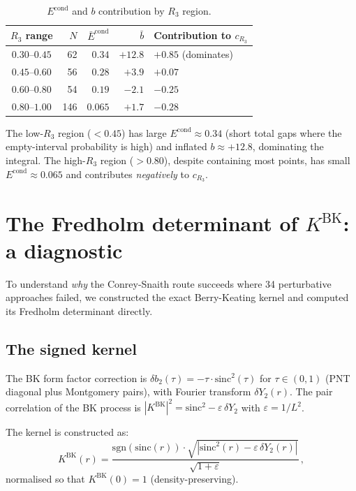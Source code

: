 \documentclass[11pt]{article}
\begin{document}
\begin{table}[ht]
\centering
\caption{$E^{\mathrm{cond}}$ and $b$ contribution by $R_3$ region.}
\label{tab:regions}
\begin{tabular}{crrrl}
\toprule
$R_3$ range & $N$ & $\bar{E}^{\mathrm{cond}}$ & $\bar{b}$ & Contribution to $c_{R_3}$ \\
\midrule
$0.30$--$0.45$ & 62 & $0.34$ & $+12.8$ & $+0.85$ (dominates) \\
$0.45$--$0.60$ & 56 & $0.28$ & $+3.9$ & $+0.07$ \\
$0.60$--$0.80$ & 54 & $0.19$ & $-2.1$ & $-0.25$ \\
$0.80$--$1.00$ & 146 & $0.065$ & $+1.7$ & $-0.28$ \\
\bottomrule
\end{tabular}
\end{table}

The low-$R_3$ region ($< 0.45$) has large $E^{\mathrm{cond}} \approx 0.34$
(short total gaps where the empty-interval probability is high) and inflated
$b \approx +12.8$, dominating the integral. The high-$R_3$ region ($> 0.80$),
despite containing most points, has small $E^{\mathrm{cond}} \approx 0.065$
and contributes \emph{negatively} to $c_{R_3}$.


\section{The Fredholm determinant of $K^{\mathrm{BK}}$: a diagnostic}
\label{sec:fredholm}

To understand \emph{why} the Conrey-Snaith route succeeds where 34 perturbative
approaches failed, we constructed the exact Berry-Keating kernel and computed
its Fredholm determinant directly.

\subsection{The signed kernel}

The BK form factor correction is $\delta b_2(\tau) = -\tau \cdot \mathrm{sinc}^2(\tau)$
for $\tau \in (0,1)$ (PNT diagonal plus Montgomery pairs), with Fourier
transform $\delta Y_2(r)$. The pair correlation of the BK process is
$|K^{\mathrm{BK}}|^2 = \mathrm{sinc}^2 - \varepsilon\,\delta Y_2$
with $\varepsilon = 1/L^2$.

The kernel is constructed as:
\begin{equation}
K^{\mathrm{BK}}(r) = \frac{\mathrm{sgn}(\mathrm{sinc}(r)) \cdot
\sqrt{|\mathrm{sinc}^2(r) - \varepsilon\,\delta Y_2(r)|}}
{\sqrt{1 + \varepsilon}}\,,
\label{eq:KBK}
\end{equation}
normalised so that $K^{\mathrm{BK}}(0) = 1$ (density-preserving).
\end{document}
